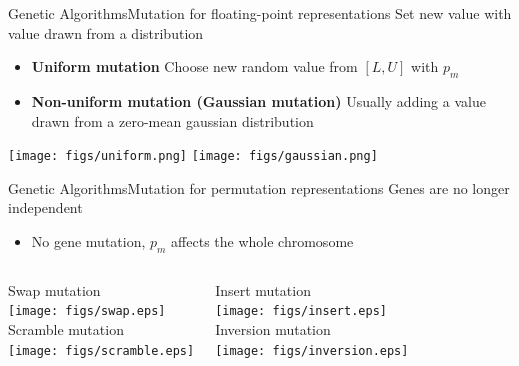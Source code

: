 \documentclass[10pt,compress]{beamer} %
\begin{document}
\begin{frame}{Genetic Algorithms}{Mutation for floating-point representations}
	Set new value with value drawn from a distribution
	\begin{itemize}
		\item \textbf{Uniform mutation} Choose new random value from $[L, U]$ with $p_m$
		\item \textbf{Non-uniform mutation (Gaussian mutation)} Usually adding a value drawn from a zero-mean gaussian  distribution
	\end{itemize}
	\begin{center}
	\texttt{[image: figs/uniform.png]}
	\texttt{[image: figs/gaussian.png]}
	\end{center}
\end{frame}

\begin{frame}{Genetic Algorithms}{Mutation for permutation representations}
	Genes are no longer independent
	\begin{itemize}
		\item No gene mutation, $p_m$ affects the whole chromosome
	\end{itemize}
    \begin{columns}
		\begin{center}
		Swap mutation\\
		\texttt{[image: figs/swap.eps]}\\
		Scramble mutation\\
		\texttt{[image: figs/scramble.eps]}\\
		\end{center}
		\begin{center}
		Insert mutation\\
		\texttt{[image: figs/insert.eps]}\\
		Inversion mutation\\
		\texttt{[image: figs/inversion.eps]}\\
		\end{center}
	   \end{columns}
\end{frame}
\end{document}
